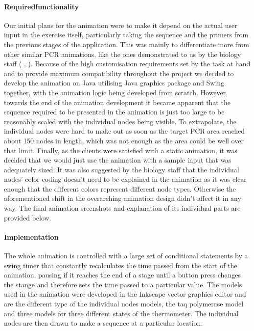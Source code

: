 \paragraph{Requiredfunctionality}
Our initial plans for the animation were to make it depend on the actual user input in the exercise itself, particularly taking the sequence and the primers from the previous stages of the application. This was mainly to differentiate more from other similar PCR animations, like the ones demonstrated to us by the biology staff (\cite{anim1} , \cite{anim2}). Because of the high customisation requirements set by the task at hand and to provide maximum compatibility throughout the project we decded to develop the animation on Java utilising Java graphics package and Swing together, with the animation logic being developed from scratch. However, towards the end of the animation development it became apparent that the sequence required to be presented in the animation is just too large to be reasonably scaled with the individual nodes being visible. To extrapolate, the individual nodes were hard to make out as soon as the target PCR area reached about 150 nodes in length, which was not enough as the area could be well over that limit. Finally, as the clients were satisfied with a static animation, it was decided that we would just use the animation with a sample input that  was adequately sized. It was also suggested by the biology staff that the individual nodes' color coding doesn't need to be explained in the animation as it was clear enough that the different colors represent different node types. Otherwise the aforementioned shift in the overarching animation design didn't affect it in any way. The final animation sreenshots and explanation of its individual parts are provided below.

\paragraph{Implementation}
The whole animation is controlled with a large set of conditional statements by a swing timer that constantly recalculates the time passed from the start of the animation, pausing if it reaches the end of a stage until a button press changes the stange and therefore sets the time passed to a particular value. The models used in the animation were developed in the Inkscape vector graphics editor and are the different type of the individual nodes models, the taq polymerase model and three models for three different states of the thermometer. The individual nodes are then drawn to make a sequence at a particular location.

